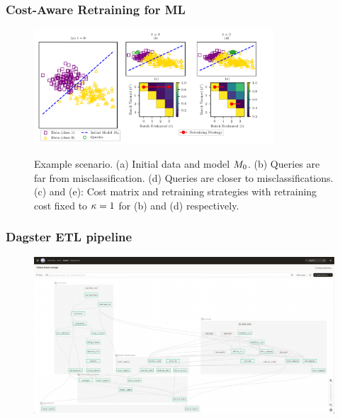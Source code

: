 \documentclass[pdf]{beamer}
\begin{document}
\begin{frame}
    \frametitle{Cost-Aware Retraining for ML}
    \begin{figure}[h]
        \centering
        {\includegraphics[width=0.8\textwidth,clip,trim={0 2.5mm 0 5.5mm}]{figs/proof_of_concept.pdf}}
        \caption{Example scenario. (a) Initial data and model $M_0$. (b) Queries are far from misclassification. (d) Queries are closer to misclassifications. (c) and (e): Cost matrix and \oracle retraining strategies with retraining cost fixed to $\kappa=1$ for (b) and (d) respectively.}
        \label{fig:scenario-1-extended}
    \end{figure}
    

\end{frame}



\begin{frame}
    \frametitle{Dagster ETL pipeline}
    \begin{figure}
        \centering
        \includegraphics[width=\textwidth]{figs/dagster.png}
        
    \end{figure}
    

\end{frame}
\end{document}
